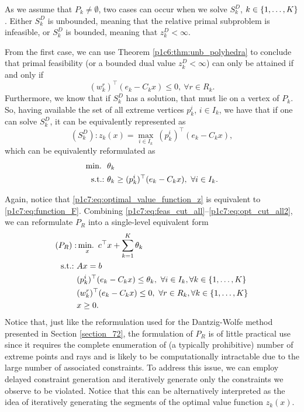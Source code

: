 As we assume that $P_k \neq \emptyset$, two cases can occur when we solve $S^D_k$, $k \in \left\{ 1,\dots, K \right \}$. Either $S^D_k$ is unbounded, meaning that the relative primal subproblem is infeasible, or $S^D_k$ is bounded, meaning that $z^D_k < \infty$.

From the first case, we can use Theorem \ref{p1c6:thm:unb_polyhedra} to conclude that primal feasibility (or a bounded dual value $z^D_k < \infty$) can only be attained if and only if
%
\begin{equation}
	(w^r_k)^\top (e_k - C_k x) \leq 0, \ \forall r \in R_k. \label{p1c7:eq:feas_cut_all}	
\end{equation}
%
Furthermore, we know that if $S^D_k$ has a solution, that must lie on a vertex of $P_k$. So, having  available the set of all extreme vertices $p_k^i$, $i \in I_k$, we have that if one can solve $S^D_k$, it can be equivalently represented as
%
\begin{equation} \label{p1c7:eq:optimal_value_function_z}
	(S^D_k) : z_k(x) = \max_{i \in I_k}~ (p^i_k)^\top (e_k - C_k x),
\end{equation}   
%
which can be equivalently reformulated as
\begin{align}
	\mathop{\text{min.~}} \ & \theta_k \label{p1c7:eq:opt_cut_all1} \\
	\mathop{\text{s.t.:~}} & \theta_k \geq (p^i_k)^\top (e_k - C_k x), \ \forall i \in I_k. \label{p1c7:eq:opt_cut_all2}
\end{align}

Again, notice that \eqref{p1c7:eq:optimal_value_function_z} is equivalent to \eqref{p1c7:eq:function_F}. Combining \eqref{p1c7:eq:feas_cut_all}--\eqref{p1c7:eq:opt_cut_all2}, we can reformulate $P_R$ into a single-level equivalent form 
%
\begin{align}
	(P_R) : & \mathop{\text{min.~}}_x c^\top x + \sum_{k=1}^K\theta_k \nonumber\\
	\mathop{\text{s.t.:~}}   & Ax = b \nonumber \\
		  & (p^i_k)^\top (e_k - C_k x) \leq  \theta_k, \ \forall i \in I_k, \forall k \in \left\{ 1,\dots, K \right \}  \label{p1c7:eq:opt_cut} \\
		  & 	(w^r_k)^\top (e_k - C_k x) \leq 0, \ \forall r \in R_k, \forall k \in \left\{ 1, \dots, K \right \} \label{p1c7:eq:feas_cut} \\
	      & x \geq 0. \nonumber
\end{align}
%
Notice that, just like the reformulation used for the Dantzig-Wolfe method presented in Section \ref{section_72}, the formulation of $P_R$ is of little practical use since it requires the complete enumeration of (a typically prohibitive) number of extreme points and rays and is likely to be computationally intractable due to the large number of associated constraints. To address this issue, we can employ delayed constraint generation and iteratively generate only the constraints we observe to be violated. Notice that this can be alternatively interpreted as the idea of iteratively generating the segments of the optimal value function $z_k(x)$.

